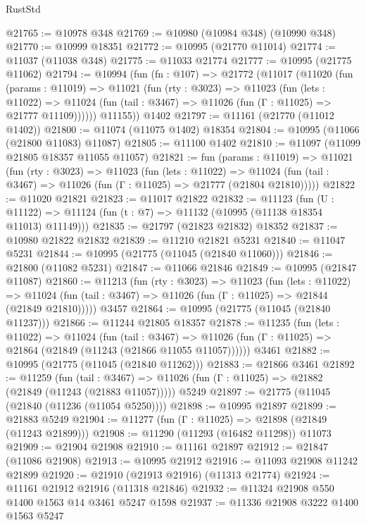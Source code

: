 \begin{lexlean}{RustStd}
\begin{coremodule}
@21765 := @10978 @348
@21769 := @10980 (@10984 @348) (@10990 @348)
@21770 := @10999 @18351
@21772 := @10995 (@21770 @11014)
@21774 := @11037 (@11038 @348)
@21775 := @11033 @21774
@21777 := @10995 (@21775 @11062)
@21794 := @10994
    (fun (fn : @107) =>
    @21772
      (@11017
        (@11020
          (fun (params : @11019) =>
          @11021
            (fun (rty : @3023) =>
            @11023
              (fun (lets : @11022) =>
              @11024 (fun (tail : @3467) => @11026 (fun (Γ : @11025) => @21777 @11109))))))
        @11155))
    @1402
@21797 := @11161 (@21770 (@11012 @1402))
@21800 := @11074 (@11075 @1402) @18354
@21804 := @10995 (@11066 (@21800 @11083) @11087)
@21805 := @11100 @1402
@21810 := @11097 (@11099 @21805 @18357 @11055 @11057)
@21821 := fun (params : @11019) =>
  @11021
    (fun (rty : @3023) =>
    @11023
      (fun (lets : @11022) =>
      @11024 (fun (tail : @3467) => @11026 (fun (Γ : @11025) => @21777 (@21804 @21810)))))
@21822 := @11020 @21821
@21823 := @11017 @21822
@21832 := @11123
    (fun (U : @11122) => @11124 (fun (t : @7) => @11132 (@10995 (@11138 @18354 @11013) @11149)))
@21835 := @21797 (@21823 @21832) @18352
@21837 := @10980 @21822 @21832
@21839 := @11210 @21821 @5231
@21840 := @11047 @5231
@21844 := @10995 (@21775 (@11045 (@21840 @11060)))
@21846 := @21800 (@11082 @5231)
@21847 := @11066 @21846
@21849 := @10995 (@21847 @11087)
@21860 := @11213
    (fun (rty : @3023) =>
    @11023
      (fun (lets : @11022) =>
      @11024 (fun (tail : @3467) => @11026 (fun (Γ : @11025) => @21844 (@21849 @21810)))))
    @3457
@21864 := @10995 (@21775 (@11045 (@21840 @11237)))
@21866 := @11244 @21805 @18357
@21878 := @11235
    (fun (lets : @11022) =>
    @11024
      (fun (tail : @3467) =>
      @11026 (fun (Γ : @11025) => @21864 (@21849 (@11243 (@21866 @11055 @11057))))))
    @3461
@21882 := @10995 (@21775 (@11045 (@21840 @11262)))
@21883 := @21866 @3461
@21892 := @11259
    (fun (tail : @3467) => @11026 (fun (Γ : @11025) => @21882 (@21849 (@11243 (@21883 @11057)))))
    @5249
@21897 := @21775 (@11045 (@21840 (@11236 (@11054 @5250))))
@21898 := @10995 @21897
@21899 := @21883 @5249
@21904 := @11277 (fun (Γ : @11025) => @21898 (@21849 (@11243 @21899)))
@21908 := @11290 (@11293 (@16482 @11298)) @11073
@21909 := @21904 @21908
@21910 := @11161 @21897
@21912 := @21847 (@11086 @21908)
@21913 := @10995 @21912
@21916 := @11093 @21908 @11242 @21899
@21920 := @21910 (@21913 @21916) (@11313 @21774)
@21924 := @11161 @21912 @21916 (@11318 @21846)
@21932 := @11324 @21908 @550 @1400 @1563 @14 @3461 @5247 @1598
@21937 := @11336 @21908 @3222 @1400 @1563 @5247

\end{coremodule}
\end{lexlean}
